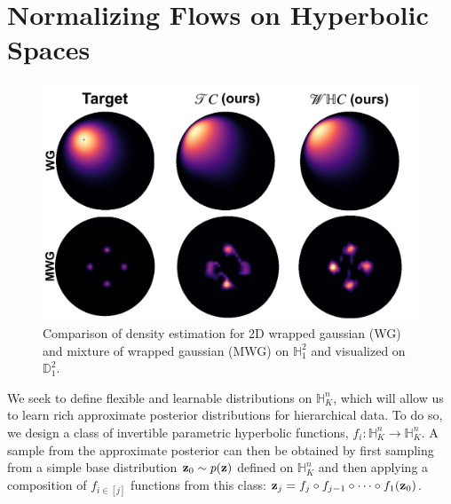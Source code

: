 \section{Normalizing Flows on Hyperbolic Spaces}
 \begin{figure}
     \centering
     \includegraphics[width=\linewidth]{hyperbolic_density_graphic.pdf}
     \vspace{-10pt}
     \caption{Comparison of density estimation for 2D wrapped gaussian (WG) and mixture of wrapped gaussian (MWG) on $\mathbb{H}^2_1$ and visualized on $\mathbb{D}^2_1$.}
     \vspace{-10pt}
     \label{fig:density_estimation}
 \end{figure}
We seek to define flexible and learnable distributions on $\mathbb{H}^n_K$, which will allow us to learn rich approximate posterior distributions for hierarchical data.
To do so, we design a class of invertible parametric hyperbolic functions, $f_i: \mathbb{H}^n_K \to \mathbb{H}^n_K$.
A sample from the approximate posterior can then be obtained by first sampling from a simple base distribution $\mathbf{z}_0 \sim p(\mathbf{z})$ defined on $\mathbb{H}^n_K$ and then applying a composition of $f_{i\in[j]}$ functions from this class: $\mathbf{z}_j = f_j \circ f_{j-1} \circ \dots \circ f_1(\mathbf{z}_0)$.

